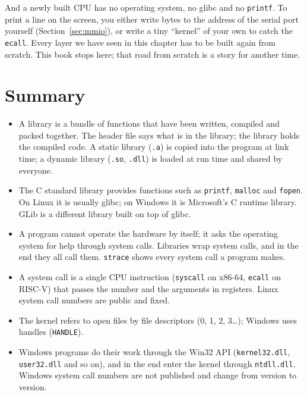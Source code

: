 And a newly built CPU has no operating system, no glibc and no \texttt{printf}. To print a line on the screen, you either write bytes to the address of the serial port yourself (Section~\ref{sec:mmio}), or write a tiny ``kernel'' of your own to catch the \texttt{ecall}. Every layer we have seen in this chapter has to be built again from scratch. This book stops here; that road from scratch is a story for another time.

\section{Summary}

\begin{itemize}
  \item A library is a bundle of functions that have been written, compiled and packed together. The header file says what is in the library; the library holds the compiled code. A static library (\texttt{.a}) is copied into the program at link time; a dynamic library (\texttt{.so}, \texttt{.dll}) is loaded at run time and shared by everyone.
  \item The C standard library provides functions such as \texttt{printf}, \texttt{malloc} and \texttt{fopen}. On Linux it is usually glibc; on Windows it is Microsoft's C runtime library. GLib is a different library built on top of glibc.
  \item A program cannot operate the hardware by itself; it asks the operating system for help through system calls. Libraries wrap system calls, and in the end they all call them. \texttt{strace} shows every system call a program makes.
  \item A system call is a single CPU instruction (\texttt{syscall} on x86-64, \texttt{ecall} on RISC-V) that passes the number and the arguments in registers. Linux system call numbers are public and fixed.
  \item The kernel refers to open files by file descriptors (0, 1, 2, 3\ldots{}); Windows uses handles (\texttt{HANDLE}).
  \item Windows programs do their work through the Win32 API (\texttt{kernel32.dll}, \texttt{user32.dll} and so on), and in the end enter the kernel through \texttt{ntdll.dll}. Windows system call numbers are not published and change from version to version.
\end{itemize}


